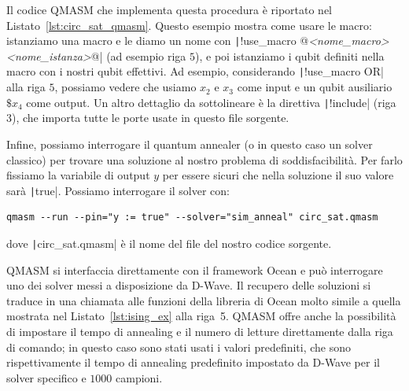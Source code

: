 \begin{listingenv}[h]
	\caption{Soddisfacibilità del circuito}
	\label{lst:circ_sat_qmasm}
\end{listingenv}

Il codice QMASM che implementa questa procedura è riportato nel Listato~\ref{lst:circ_sat_qmasm}. Questo esempio mostra come usare le macro: istanziamo una macro e le diamo un nome con \texttt|!use_macro @\textit{<nome\_macro> <nome\_istanza>}@| (ad esempio riga $5$), e poi istanziamo i qubit definiti nella macro con i nostri qubit effettivi. Ad esempio, considerando \texttt|!use_macro OR| alla riga $5$, possiamo vedere che usiamo $x_2$ e $x_3$ come input e un qubit ausiliario $\$x_4$ come output. Un altro dettaglio da sottolineare è la direttiva \texttt|!include| (riga $3$), che importa tutte le porte usate in questo file sorgente.

Infine, possiamo interrogare il quantum annealer (o in questo caso un solver classico) per trovare una soluzione al nostro problema di soddisfacibilità. Per farlo fissiamo la variabile di output $y$ per essere sicuri che nella soluzione il suo valore sarà \texttt|true|. Possiamo interrogare il solver con:

\begin{center}
	\vspace{-.1cm}
	\begin{minipage}{.95\linewidth}
		\begin{verbatim}
qmasm --run --pin="y := true" --solver="sim_anneal" circ_sat.qmasm
		\end{verbatim}
	\end{minipage}
\end{center}
dove \texttt|circ_sat.qmasm| è il nome del file del nostro codice sorgente. 

QMASM si interfaccia direttamente con il framework Ocean e può interrogare uno dei solver messi a disposizione da D-Wave. Il recupero delle soluzioni si traduce in una chiamata alle funzioni della libreria di Ocean molto simile a quella mostrata nel Listato~\ref{lst:ising_ex} alla riga~5. QMASM offre anche la possibilità di impostare il tempo di annealing e il numero di letture direttamente dalla riga di comando; in questo caso sono stati usati i valori predefiniti, che sono rispettivamente il tempo di annealing predefinito impostato da D-Wave per il solver specifico e $1000$ campioni.

